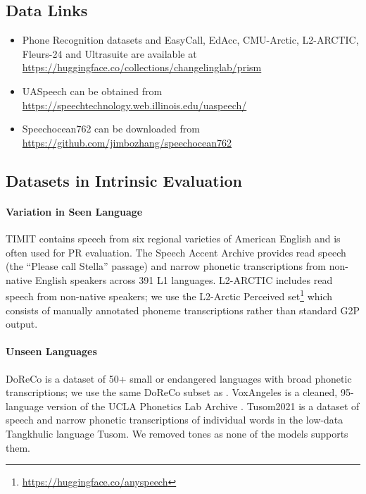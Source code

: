 \subsection{Data Links}
\label{appendix:datalinks}
\begin{itemize}
    \item Phone Recognition datasets and EasyCall, EdAcc, CMU-Arctic, L2-ARCTIC, Fleurs-24 and Ultrasuite are available at \url{https://huggingface.co/collections/changelinglab/prism}
    \item UASpeech can be obtained from \url{https://speechtechnology.web.illinois.edu/uaspeech/}
    \item Speechocean762 can be downloaded from \url{https://github.com/jimbozhang/speechocean762}
\end{itemize}

\subsection{Datasets in Intrinsic Evaluation}
\label{appendix:datadetails-pr}
\paragraph{Variation in Seen Language}
TIMIT \citep{garofolo1993timit} contains speech from six regional varieties of American English and is often used for PR evaluation.
The Speech Accent Archive \citep{gmuspeechaccentarchive} provides read speech (the ``Please call Stella'' passage) and narrow phonetic transcriptions from non-native English speakers across 391 L1 languages.
L2-ARCTIC \cite{zhao2018l2arctic} includes read speech from non-native speakers; we use the L2-Arctic Perceived set\footnote{\url{https://huggingface.co/anyspeech}} which consists of manually annotated phoneme transcriptions rather than standard G2P output.

\paragraph{Unseen Languages}
DoReCo \citep{paschen2020doreco} is a dataset of 50+ small or endangered languages with broad phonetic transcriptions; we use the same DoReCo subset as \citet{zipa,zhu-etal-2024-taste}.
VoxAngeles \citep{chodroff2024voxangeles} is a cleaned, 95-language version of the UCLA Phonetics Lab Archive \citep{ucla2009}.
Tusom2021 \citep{mortensen2021tusom2021} is a dataset of speech and narrow phonetic transcriptions of individual words in the low-data Tangkhulic language Tusom. We removed tones as none of the models supports them.

